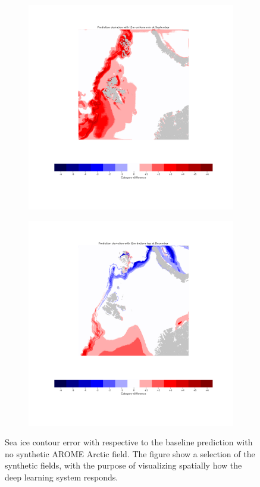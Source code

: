 \documentclass[../main/thesis.tex]{subfiles}
\begin{document}
\begin{figure}
\begin{subfigure}{.49\textwidth}
    \end{subfigure}
    \begin{subfigure}{.49\textwidth}
        \includegraphics[width=\textwidth]{bias_t2m-uniform-min}
    \end{subfigure}
    \begin{subfigure}{.49\textwidth}
        \includegraphics[width=\textwidth]{bias_t2m-bottom-top}
    \end{subfigure}
    \caption{\label{fig:synthetic_aa_bias}Sea ice contour error with respective to the baseline prediction with no synthetic AROME Arctic field. The figure show a selection of the synthetic fields, with the purpose of visualizing spatially how the deep learning system responds. }
\end{figure}
\end{document}
